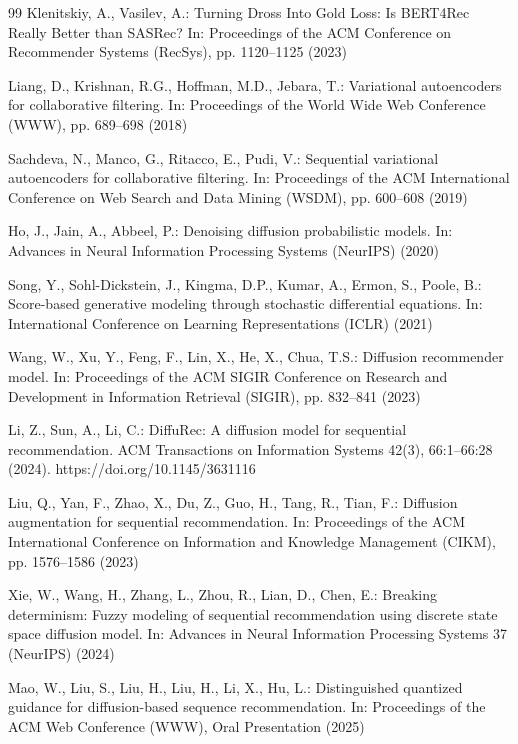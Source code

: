 \documentclass[runningheads,a4paper]{llncs}
\begin{document}
\begin{thebibliography}{99}
Klenitskiy, A., Vasilev, A.: Turning Dross Into Gold Loss: Is BERT4Rec Really Better than SASRec? In: Proceedings of the ACM Conference on Recommender Systems (RecSys), pp. 1120--1125 (2023)

Liang, D., Krishnan, R.G., Hoffman, M.D., Jebara, T.: Variational autoencoders for collaborative filtering. In: Proceedings of the World Wide Web Conference (WWW), pp. 689--698 (2018)

Sachdeva, N., Manco, G., Ritacco, E., Pudi, V.: Sequential variational autoencoders for collaborative filtering. In: Proceedings of the ACM International Conference on Web Search and Data Mining (WSDM), pp. 600--608 (2019)

Ho, J., Jain, A., Abbeel, P.: Denoising diffusion probabilistic models. In: Advances in Neural Information Processing Systems (NeurIPS) (2020)

Song, Y., Sohl-Dickstein, J., Kingma, D.P., Kumar, A., Ermon, S., Poole, B.: Score-based generative modeling through stochastic differential equations. In: International Conference on Learning Representations (ICLR) (2021)

Wang, W., Xu, Y., Feng, F., Lin, X., He, X., Chua, T.S.: Diffusion recommender model. In: Proceedings of the ACM SIGIR Conference on Research and Development in Information Retrieval (SIGIR), pp. 832--841 (2023)

Li, Z., Sun, A., Li, C.: DiffuRec: A diffusion model for sequential recommendation. ACM Transactions on Information Systems 42(3), 66:1--66:28 (2024). https://doi.org/10.1145/3631116

Liu, Q., Yan, F., Zhao, X., Du, Z., Guo, H., Tang, R., Tian, F.: Diffusion augmentation for sequential recommendation. In: Proceedings of the ACM International Conference on Information and Knowledge Management (CIKM), pp. 1576--1586 (2023)

Xie, W., Wang, H., Zhang, L., Zhou, R., Lian, D., Chen, E.: Breaking determinism: Fuzzy modeling of sequential recommendation using discrete state space diffusion model. In: Advances in Neural Information Processing Systems 37 (NeurIPS) (2024)

Mao, W., Liu, S., Liu, H., Liu, H., Li, X., Hu, L.: Distinguished quantized guidance for diffusion-based sequence recommendation. In: Proceedings of the ACM Web Conference (WWW), Oral Presentation (2025)


\end{thebibliography}
\end{document}
